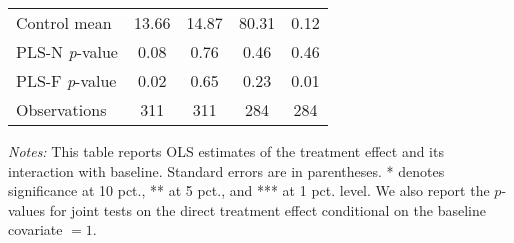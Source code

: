 \begin{table}[ht]
{\begin{threeparttable}
\begin{tabular}{l*{4}{c}}
Control mean    &    13.66         &    14.87         &    80.31         &     0.12         \\
PLS-N \emph{p}-value&     0.08         &     0.76         &     0.46         &     0.46         \\
PLS-F \emph{p}-value&     0.02         &     0.65         &     0.23         &     0.01         \\
Observations    &      311         &      311         &      284         &      284         \\
\bottomrule \end{tabular} \begin{tablenotes}[flushleft] \footnotesize \item \emph{Notes:} This table reports OLS estimates of the treatment effect and its interaction with baseline. Standard errors are in parentheses. * denotes significance at 10 pct., ** at 5 pct., and *** at 1 pct. level. We also report the \(p\)-values for joint tests on the direct treatment effect conditional on the baseline covariate $= 1$. \end{tablenotes} \end{threeparttable} } \end{table}

